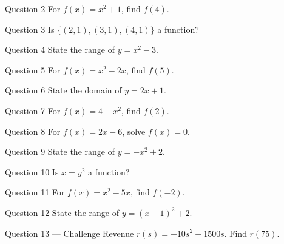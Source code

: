 \documentclass[11pt]{article}
\begin{document}
\begin{qbox}{Question 2}
For $f(x)=x^2+1$, find $f(4)$.\workspace{2.4cm}
\end{qbox}

\begin{qbox}{Question 3}
Is $\{(2,1),(3,1),(4,1)\}$ a function?\workspace{2.4cm}
\end{qbox}

\begin{qbox}{Question 4}
State the range of $y=x^2-3$.\workspace{2.4cm}
\end{qbox}

\begin{qbox}{Question 5}
For $f(x)=x^2-2x$, find $f(5)$.\workspace{2.4cm}
\end{qbox}

\begin{qbox}{Question 6}
State the domain of $y=2x+1$.\workspace{2.4cm}
\end{qbox}

\begin{qbox}{Question 7}
For $f(x)=4-x^2$, find $f(2)$.\workspace{2.4cm}
\end{qbox}

\begin{qbox}{Question 8}
For $f(x)=2x-6$, solve $f(x)=0$.\workspace{2.4cm}
\end{qbox}

\begin{qbox}{Question 9}
State the range of $y=-x^2+2$.\workspace{2.4cm}
\end{qbox}

\begin{qbox}{Question 10}
Is $x=y^2$ a function?\workspace{2.4cm}
\end{qbox}

\begin{qbox}{Question 11}
For $f(x)=x^2-5x$, find $f(-2)$.\workspace{2.4cm}
\end{qbox}

\begin{qbox}{Question 12}
State the range of $y=(x-1)^2+2$.\workspace{2.4cm}
\end{qbox}

\begin{qbox}{Question 13 --- Challenge}
Revenue $r(s)=-10s^2+1500s$. Find $r(75)$.\workspace{3cm}
\end{qbox}

\clearpage
{}
\end{document}
